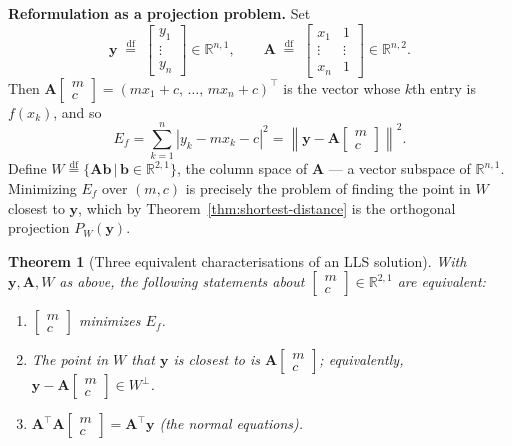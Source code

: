 \documentclass[11pt, a4paper, notitlepage]{report}
\newtheorem{theorem}{Theorem}[section]
\theoremstyle{definition}
\theoremstyle{remark}
\begin{document}
\smallskip
\noindent\textbf{Reformulation as a projection problem.} Set
\[
  \mathbf{y} \;\stackrel{\mathrm{df}}{=}\;
  \begin{bmatrix}y_1\\\vdots\\y_n\end{bmatrix}\in\mathbb{R}^{n,1},
  \qquad
  \mathbf{A} \;\stackrel{\mathrm{df}}{=}\;
  \begin{bmatrix}x_1 & 1\\ \vdots & \vdots \\ x_n & 1\end{bmatrix}\in\mathbb{R}^{n,2}.
\]
Then $\mathbf{A}\begin{bmatrix}m\\c\end{bmatrix} = (mx_1+c,\,\ldots,\,mx_n+c)^\top$
is the vector whose $k$th entry is $f(x_k)$, and so
\[
  E_f
  = \sum_{k=1}^{n}|y_k - mx_k - c|^2
  = \left\|\mathbf{y} - \mathbf{A}\begin{bmatrix}m\\c\end{bmatrix}\right\|^2.
\]
Define $W \stackrel{\mathrm{df}}{=} \{\mathbf{A}\mathbf{b} \,|\, \mathbf{b}\in\mathbb{R}^{2,1}\}$,
the column space of $\mathbf{A}$ --- a vector subspace of $\mathbb{R}^{n,1}$.
Minimizing $E_f$ over $(m,c)$ is precisely the problem of finding the point
in $W$ closest to $\mathbf{y}$, which by Theorem~\ref{thm:shortest-distance}
is the orthogonal projection $P_W(\mathbf{y})$.

\begin{theorem}[Three equivalent characterisations of an LLS solution]
\label{thm:lls-equivalence}
With $\mathbf{y}, \mathbf{A}, W$ as above, the following statements about
$\begin{bmatrix}m\\c\end{bmatrix}\in\mathbb{R}^{2,1}$ are equivalent:
\begin{enumerate}
  \item $\begin{bmatrix}m\\c\end{bmatrix}$ minimizes $E_f$.
  \item The point in $W$ that $\mathbf{y}$ is closest to is
        $\mathbf{A}\begin{bmatrix}m\\c\end{bmatrix}$;
        equivalently, $\mathbf{y} - \mathbf{A}\begin{bmatrix}m\\c\end{bmatrix}\in W^\perp$.
  \item $\mathbf{A}^\top\mathbf{A}\begin{bmatrix}m\\c\end{bmatrix} = \mathbf{A}^\top\mathbf{y}$
        (the \emph{normal equations}).
\end{enumerate}
\end{theorem}
\end{document}
